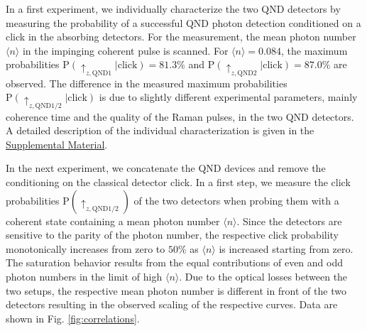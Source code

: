 \documentclass[prl,amsmath,amssymb,bibnotes,aps,longbibliography,12pt]{revtex4-1}
\newcommand{\braket}[1]{\langle{#1}\rangle}
\begin{document}
In a first experiment, we individually characterize the two QND detectors by measuring the probability of a successful QND photon detection conditioned on a click in the absorbing detectors. For the measurement, the mean photon number $\braket{n}$ in the impinging coherent pulse is scanned. For $\braket{n}=0.084$, the maximum probabilities $\text{P}(\uparrow_{z, \text{QND1}}\vert\text{click})=81.3\%$ and $\text{P}(\uparrow_{z, \text{QND2}}\vert\text{click})=87.0\%$ are observed. The difference in the measured maximum probabilities $\text{P}(\uparrow_{z, \text{QND1/2}}\vert\text{click})$ is due to slightly different experimental parameters, mainly coherence time and the quality of the Raman pulses, in the two QND detectors. A detailed description of the individual characterization is given in the \hyperref[supplement]{Supplemental Material}.

In the next experiment, we concatenate the QND devices and remove the conditioning on the classical detector click. In a first step, we measure the click probabilities $\text{P}(\uparrow_{z,\text{QND1/2}})$ of the two detectors when probing them with a coherent state containing a mean photon number $\braket{n}$. Since the detectors are sensitive to the parity of the photon number, the respective click probability monotonically increases from zero to $50\%$ as $\braket{n}$ is increased starting from zero. The saturation behavior results from the equal contributions of even and odd photon numbers in the limit of high $\braket{n}$. Due to the optical losses between the two setups, the respective mean photon number is different in front of the two detectors resulting in the observed scaling of the respective curves. Data are shown in Fig. \ref{fig:correlations}.
\end{document}
